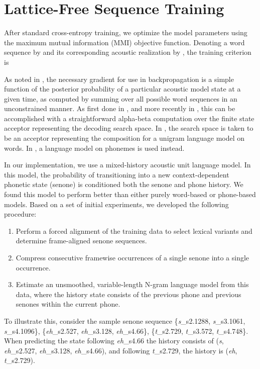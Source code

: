 \documentclass{article}
\begin{document}
\section{Lattice-Free Sequence Training}
\label{sec:lfmmi}

After standard cross-entropy training, we optimize the model parameters using
the maximum mutual information (MMI) objective function. Denoting a word sequence by  and its 
corresponding acoustic realization by , the training criterion is

As noted in \cite{sim2010sequential,vesely2013sequence},
the necessary gradient for use in backpropagation is a simple function 
of the posterior probability of a  particular acoustic model state at a given
time, as computed by summing over all possible word sequences in an 
unconstrained manner.  As first done in \cite{chen2006advances},  and more
recently in \cite{povey2016purely}, this can be accomplished with a 
straightforward alpha-beta computation over the finite state acceptor 
representing the decoding search space. In \cite{chen2006advances}, the 
search space is taken to be an acceptor representing the composition  for a 
unigram language model  on words.
In \cite{povey2016purely}, a language model on phonemes is used instead.

In our implementation, we use a mixed-history acoustic unit language model.
In this model, the probability of transitioning into a new context-dependent phonetic state (senone)
is conditioned both the senone and phone history.
We found this model to perform better than either purely word-based or phone-based models.
Based on a set of initial experiments, we developed the following procedure:
\begin{enumerate}
\item Perform a forced alignment of the training data to select 
lexical variants and determine frame-aligned senone sequences.
\item Compress consecutive framewise occurrences of a single senone into a single occurrence. 
\item Estimate an unsmoothed, variable-length N-gram language model from this data, where the history state consists of the previous phone and previous senones within the current phone.
\end{enumerate}
\newcommand{\phone}[1]{{\it #1}}
\newcommand{\state}[2]{{\it #1}\_s#2}
To illustrate this, consider the sample senone sequence
\{\state{s}{2.1288}, \state{s}{3.1061}, \state{s}{4.1096}\},
\{\state{eh}{2.527}, \state{eh}{3.128}, \state{eh}{4.66}\},
\{\state{t}{2.729}, \state{t}{3.572}, \state{t}{4.748}\}.
When predicting the state following \state{eh}{4.66} the history consists of
(\phone{s}, \state{eh}{2.527}, \state{eh}{3.128}, \state{eh}{4.66}),
and following \state{t}{2.729}, the history is (\phone{eh}, \state{t}{2.729}).
\end{document}
